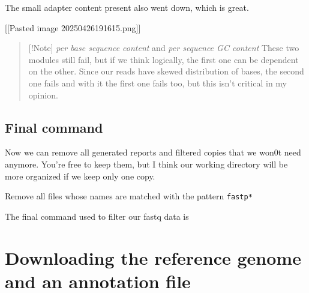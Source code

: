 The small adapter content present also went down, which is great.

{[}{[}Pasted image 20250426191615.png{]}{]}

\begin{quote}
{[}!Note{]} \emph{per base sequence content} and \emph{per sequence GC
content} These two modules still fail, but if we think logically, the
first one can be dependent on the other. Since our reads have skewed
distribution of bases, the second one fails and with it the first one
fails too, but this isn't critical in my opinion.
\end{quote}

\hypertarget{final-command}{%
\subsection{Final command}\label{final-command}}

Now we can remove all generated reports and filtered copies that we
won0t need anymore. You're free to keep them, but I think our working
directory will be more organized if we keep only one copy.

Remove all files whose names are matched with the pattern
\texttt{fastp*}

\begin{Shaded}
\begin{Highlighting}[]
\PreprocessorTok{*}
\end{Highlighting}
\end{Shaded}

The final command used to filter our fastq data is

\begin{Shaded}
\begin{Highlighting}[]
\end{Highlighting}
\end{Shaded}

\hypertarget{downloading-the-reference-genome-and-an-annotation-file}{%
\section{Downloading the reference genome and an annotation
file}\label{downloading-the-reference-genome-and-an-annotation-file}}

